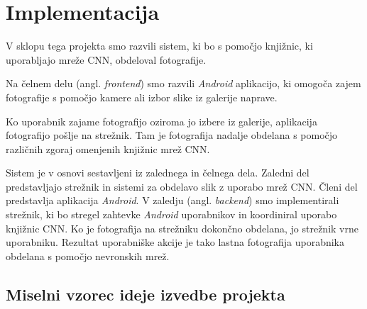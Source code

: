 \documentclass[runningheads,a4paper]{llncs}
\begin{document}


\section{Implementacija}
V sklopu tega projekta smo razvili sistem, ki bo s pomočjo knjižnic, ki uporabljajo mreže CNN, obdeloval fotografije. 

Na čelnem delu (angl. \textit{frontend}) smo razvili \textit{Android} aplikacijo, ki omogoča zajem fotografije s pomočjo kamere ali izbor slike iz galerije naprave. 


Ko uporabnik zajame fotografijo oziroma jo izbere iz galerije, aplikacija fotografijo pošlje na strežnik. Tam je fotografija nadalje obdelana s pomočjo različnih zgoraj omenjenih knjižnic mrež CNN. 

Sistem je v osnovi sestavljeni iz zalednega in čelnega dela. Zaledni del predstavljajo strežnik in sistemi za obdelavo slik z uporabo mrež CNN. Členi del predstavlja aplikacija \textit{Android}. V zaledju (angl. \textit{backend}) smo implementirali strežnik, ki bo stregel zahtevke \textit{Android} uporabnikov in koordiniral uporabo knjižnic CNN. Ko je fotografija na strežniku dokončno obdelana, jo strežnik vrne uporabniku. Rezultat uporabniške akcije je tako lastna fotografija uporabnika obdelana s pomočjo nevronskih mrež.


\subsection{Miselni vzorec ideje izvedbe projekta}
\end{document}
